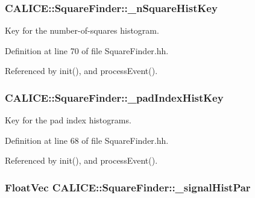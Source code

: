 \subsubsection[{\-\_\-n\-Square\-Hist\-Key}]{ C\-A\-L\-I\-C\-E\-::\-Square\-Finder\-::\-\_\-n\-Square\-Hist\-Key\hspace{0.3cm}{\ttfamily [private]}}\label{classCALICE_1_1SquareFinder_a9e2342e2496c5a353748704230eca4f2}


Key for the number-\/of-\/squares histogram. 



Definition at line 70 of file Square\-Finder.\-hh.



Referenced by init(), and process\-Event().

\subsubsection[{\-\_\-pad\-Index\-Hist\-Key}]{ C\-A\-L\-I\-C\-E\-::\-Square\-Finder\-::\-\_\-pad\-Index\-Hist\-Key\hspace{0.3cm}{\ttfamily [private]}}\label{classCALICE_1_1SquareFinder_a5d5858d456eccaced33fae1e794893d0}


Key for the pad index histograms. 



Definition at line 68 of file Square\-Finder.\-hh.



Referenced by init(), and process\-Event().

\subsubsection[{\-\_\-signal\-Hist\-Par}]{\setlength{\rightskip}{0pt plus 5cm}Float\-Vec C\-A\-L\-I\-C\-E\-::\-Square\-Finder\-::\-\_\-signal\-Hist\-Par\hspace{0.3cm}{\ttfamily [protected]}}\label{classCALICE_1_1SquareFinder_ad1db2cd08984b84ab549c2631b2e679d}


